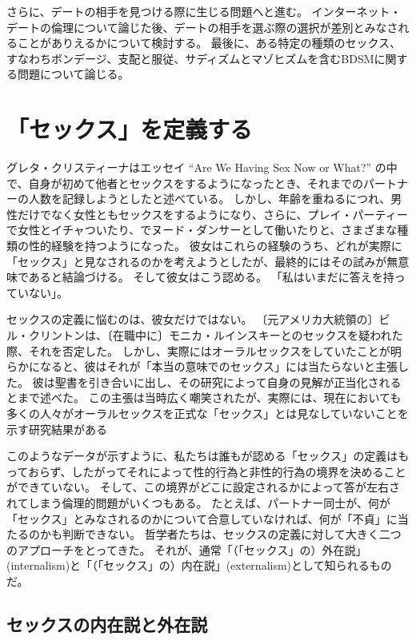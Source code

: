\documentclass[paper=a4,book,openany]{jlreq}
\begin{document}
さらに、デートの相手を見つける際に生じる問題へと進む。
インターネット・デートの倫理について論じた後、デートの相手を選ぶ際の選択が差別とみなされることがありえるかについて検討する。
最後に、ある特定の種類のセックス、すなわちボンデージ、支配と服従、サディズムとマゾヒズムを含むBDSMに関する問題について論じる。

\section{「セックス」を定義する}

グレタ・クリスティーナはエッセイ ``Are We Having Sex Now or What?'' の中で、自身が初めて他者とセックスをするようになったとき、それまでのパートナーの人数を記録しようとしたと述べている。
しかし、年齢を重ねるにつれ、男性だけでなく女性ともセックスをするようになり、さらに、プレイ・パーティーで女性とイチャついたり、でヌード・ダンサーとして働いたりと、さまざまな種類の性的経験を持つようになった。
彼女はこれらの経験のうち、どれが実際に「セックス」と見なされるのかを考えようとしたが、最終的にはその試みが無意味であると結論づける。
そして彼女はこう認める。
「私はいまだに答えを持っていない」\nocite{christina92:_are_we_havin}。

セックスの定義に悩むのは、彼女だけではない。
〔元アメリカ大統領の〕ビル・クリントンは、〔在職中に〕モニカ・ルインスキーとのセックスを疑われた際、それを否定した。
しかし、実際にはオーラルセックスをしていたことが明らかになると、彼はそれが「本当の意味でのセックス」には当たらないと主張した。
彼は聖書を引き合いに出し、その研究によって自身の見解が正当化されるとまで述べた。
この主張は当時広く嘲笑されたが、実際には、現在においても多くの人々がオーラルセックスを正式な「セックス」とは見なしていないことを示す研究結果がある\citep{dotson-blake12:_explor_social_sexual}

このようなデータが示すように、私たちは誰もが認める「セックス」の定義はもっておらず、したがってそれによって性的行為と非性的行為の境界を決めることができていない。
そして、この境界がどこに設定されるかによって答が左右されてしまう倫理的問題がいくつもある。
たとえば、パートナー同士が、何が「セックス」とみなされるのかについて合意していなければ、何が「不貞」に当たるのかも判断できない。
哲学者たちは、セックスの定義に対して大きく二つのアプローチをとってきた。
それが、通常「（「セックス」の）外在説」(internalism)と「（「セックス」の）内在説」(externalism)として知られるものだ。

\subsection{セックスの内在説と外在説}
\end{document}
